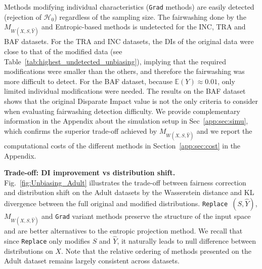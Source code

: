 \documentclass[runningheads, orivec]{llncs}
\begin{document}
Methods modifying individual characteristics (\texttt{Grad} methods) are easily detected (rejection of \( \mathcal{H}_0 \)) regardless of the sampling size. %
The fairwashing done by the $M_{W(X,S,\widehat{Y})}$ and Entropic-based methods is undetected %
for the INC, TRA and BAF datasets. 
For the TRA and INC datasets, the DIs of the original data were close to that of the modified data (see Table~\ref{tab:highest_undetected_unbiasing}), implying that the required modifications were smaller than the others, and therefore the fairwashing was more difficult to detect. For the BAF dataset, because $\mathbb{E}(Y) \approx 0.01$, only limited individual modifications were needed. The results on the BAF dataset shows that the original Disparate Impact value is not the only criteria to consider when evaluating fairwashing detection difficulty. We provide complementary information in the Appendix about the simulation setup in Sec~\ref{app:sec:simu}, which confirms the superior trade-off achieved by $M_{W(X,S,\widehat{Y})}$ and we report the computational costs of the different methods in Section~\ref{app:sec:cost} in the Appendix.


\textbf{Trade-off: DI improvement vs distribution shift.} \label{sec:opti_result}
Fig.~\ref{fig:Unbiasing_Adult} illustrates the trade-off between fairness correction and distribution shift on the Adult datasets by the Wasserstein distance and KL divergence between the full original and modified distributions. \texttt{Replace $(S,\widehat{Y})$}, \texttt{$M_{W(X,S,\widehat{Y})}$} and \texttt{Grad} variant methods preserve the structure of the input space and are better alternatives to the entropic projection method. 
We recall that since \texttt{Replace} only modifies $S$ and $\widehat{Y}$, it naturally leads to null difference between distributions on $X$. Note that the relative ordering of methods presented on the Adult dataset remains largely consistent across datasets.
\end{document}
